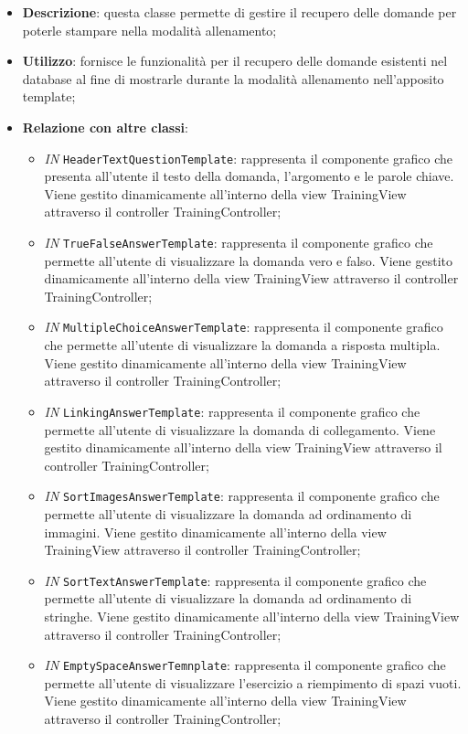 \begin{itemize}
	\item \textbf{Descrizione}: questa classe permette di gestire il recupero delle domande per poterle stampare nella modalità allenamento;
	\item \textbf{Utilizzo}: fornisce le funzionalità per il recupero delle domande esistenti nel database al fine di mostrarle durante la modalità allenamento nell'apposito template;
	\item \textbf{Relazione con altre classi}:
	\begin{itemize}
		\item \textit{IN} \texttt{HeaderTextQuestionTemplate}: rappresenta il componente grafico che presenta all'utente il testo della domanda, l'argomento e le parole chiave. Viene gestito dinamicamente all'interno della view TrainingView attraverso il controller TrainingController; 
		\item \textit{IN} \texttt{TrueFalseAnswerTemplate}: rappresenta il componente grafico che permette all'utente di visualizzare la domanda vero e falso. Viene gestito dinamicamente all'interno della view TrainingView attraverso il controller TrainingController; 
		\item \textit{IN} \texttt{MultipleChoiceAnswerTemplate}: rappresenta il componente grafico che permette all'utente di visualizzare la domanda a risposta multipla. Viene gestito dinamicamente all'interno della view TrainingView attraverso il controller TrainingController; 
		\item \textit{IN} \texttt{LinkingAnswerTemplate}: rappresenta il componente grafico che permette all'utente di visualizzare la domanda di collegamento. Viene gestito dinamicamente all'interno della view TrainingView attraverso il controller TrainingController; 
		\item \textit{IN} \texttt{SortImagesAnswerTemplate}: rappresenta il componente grafico che permette all'utente di visualizzare la domanda ad ordinamento di immagini. Viene gestito dinamicamente all'interno della view TrainingView attraverso il controller TrainingController; 
		\item \textit{IN} \texttt{SortTextAnswerTemplate}: rappresenta il componente grafico che permette all'utente di visualizzare la domanda ad ordinamento di stringhe. Viene gestito dinamicamente all'interno della view TrainingView attraverso il controller TrainingController; 
		\item \textit{IN} \texttt{EmptySpaceAnswerTemnplate}: rappresenta il componente grafico che permette all'utente di visualizzare l'esercizio a riempimento di spazi vuoti. Viene gestito dinamicamente all'interno della view TrainingView attraverso il controller TrainingController; 

\end{itemize}
\end{itemize}
